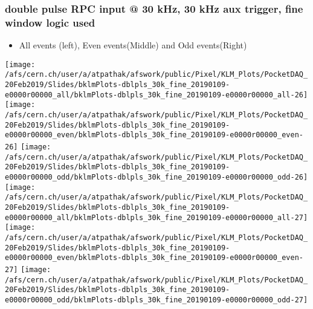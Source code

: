 \documentclass{beamer}
\begin{document}
\begin{frame}
\frametitle{\small double pulse RPC input @ 30 kHz, 30 kHz aux trigger, fine window logic used}
\vspace*{.05cm}
\begin{center}
 \begin{itemize}
\item { \small All events (left), Even events(Middle) and Odd events(Right)}
\end{itemize}
\begin{normalsize}

\vspace*{-.2cm}
\begin{center}

\texttt{[image: /afs/cern.ch/user/a/atpathak/afswork/public/Pixel/KLM\_Plots/PocketDAQ\_20Feb2019/Slides/bklmPlots-dblpls\_30k\_fine\_20190109-e0000r00000\_all/bklmPlots-dblpls\_30k\_fine\_20190109-e0000r00000\_all-26]}
\texttt{[image: /afs/cern.ch/user/a/atpathak/afswork/public/Pixel/KLM\_Plots/PocketDAQ\_20Feb2019/Slides/bklmPlots-dblpls\_30k\_fine\_20190109-e0000r00000\_even/bklmPlots-dblpls\_30k\_fine\_20190109-e0000r00000\_even-26]}
\texttt{[image: /afs/cern.ch/user/a/atpathak/afswork/public/Pixel/KLM\_Plots/PocketDAQ\_20Feb2019/Slides/bklmPlots-dblpls\_30k\_fine\_20190109-e0000r00000\_odd/bklmPlots-dblpls\_30k\_fine\_20190109-e0000r00000\_odd-26]} \\

\texttt{[image: /afs/cern.ch/user/a/atpathak/afswork/public/Pixel/KLM\_Plots/PocketDAQ\_20Feb2019/Slides/bklmPlots-dblpls\_30k\_fine\_20190109-e0000r00000\_all/bklmPlots-dblpls\_30k\_fine\_20190109-e0000r00000\_all-27]}
\texttt{[image: /afs/cern.ch/user/a/atpathak/afswork/public/Pixel/KLM\_Plots/PocketDAQ\_20Feb2019/Slides/bklmPlots-dblpls\_30k\_fine\_20190109-e0000r00000\_even/bklmPlots-dblpls\_30k\_fine\_20190109-e0000r00000\_even-27]}
\texttt{[image: /afs/cern.ch/user/a/atpathak/afswork/public/Pixel/KLM\_Plots/PocketDAQ\_20Feb2019/Slides/bklmPlots-dblpls\_30k\_fine\_20190109-e0000r00000\_odd/bklmPlots-dblpls\_30k\_fine\_20190109-e0000r00000\_odd-27]} \\

\end{center}
\end{normalsize}
\end{center}
\end{frame}
\end{document}
